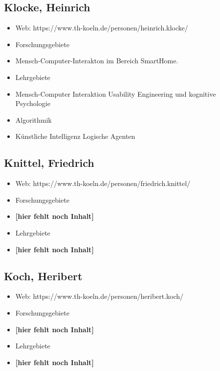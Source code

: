 \subsection{Klocke, Heinrich}\label{klocke-heinrich}

\begin{itemize}
\tightlist
\item
  Web: https://www.th-koeln.de/personen/heinrich.klocke/
\item
  Forschungsgebiete
\item
  Mensch-Computer-Interakton im Bereich SmartHome.
\item
  Lehrgebiete
\item
  Mensch-Computer Interaktion Usability Engineering und kognitive
  Psychologie
\item
  Algorithmik
\item
  Künstliche Intelligenz Logische Agenten
\end{itemize}

\subsection{Knittel, Friedrich}\label{knittel-friedrich}

\begin{itemize}
\item
  Web: https://www.th-koeln.de/personen/friedrich.knittel/
\item
  Forschungsgebiete
\item
  \textbf{{[}hier fehlt noch Inhalt{]}}
\item
  Lehrgebiete
\item
  \textbf{{[}hier fehlt noch Inhalt{]}}
\end{itemize}

\subsection{Koch, Heribert}\label{koch-heribert}

\begin{itemize}
\tightlist
\item
  Web: https://www.th-koeln.de/personen/heribert.koch/
\item
  Forschungsgebiete
\item
  \textbf{{[}hier fehlt noch Inhalt{]}}
\item
  Lehrgebiete
\item
  \textbf{{[}hier fehlt noch Inhalt{]}}
\end{itemize}

